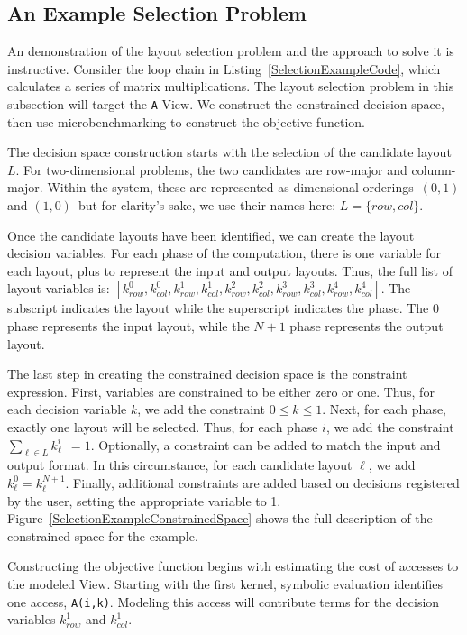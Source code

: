\subsection{An Example Selection Problem}

An demonstration of the layout selection problem and the approach to solve it is instructive.
Consider the loop chain in Listing~\ref{SelectionExampleCode}, which calculates a series of matrix multiplications.
The layout selection problem in this subsection will target the \verb.A. View.
We construct the constrained decision space, then use microbenchmarking to construct the objective function.

The decision space construction starts with the selection of the candidate layout $L$.
For two-dimensional problems, the two candidates are row-major and column-major.
Within the system, these are represented as dimensional orderings--$(0,1)$ and $(1,0)$--but for clarity's sake, we use their names here: $L=\{row,col\}$.

Once the candidate layouts have been identified, we can create the layout decision variables.
For each phase of the computation, there is one variable for each layout, plus to represent the input and output layouts.
Thus, the full list of layout variables is: $[k_{row}^{0}, k_{col}^{0}, k_{row}^{1}, k_{col}^{1},k_{row}^{2}, k_{col}^{2},k_{row}^{3}, k_{col}^{3},k_{row}^{4}, k_{col}^{4}]$.
The subscript indicates the layout while the superscript indicates the phase. 
The 0 phase represents the input layout, while the $N+1$ phase represents the output layout.

The last step in creating the constrained decision space is the constraint expression. 
First, variables are constrained to be either zero or one. 
Thus, for each decision variable $k$, we add the constraint $0 \leq k \leq 1$.
Next, for each phase, exactly one layout will be selected. 
Thus, for each phase $i$, we add the constraint $\sum_{\ell \in L} k_\ell^{i} \ \ = 1$.
Optionally, a constraint can be added to match the input and output format.
In this circumstance, for each candidate layout $\ell$, we add $k_\ell^{0} = k_\ell^{N+1}$.
Finally, additional constraints are added based on decisions registered by the user, setting the appropriate variable to 1.
Figure~\ref{SelectionExampleConstrainedSpace} shows the full description of the constrained space for the example.


Constructing the objective function begins with estimating the cost of accesses to the modeled View.
Starting with the first kernel, symbolic evaluation identifies one access, \verb.A(i,k)..
Modeling this access will contribute terms for the decision variables $k_{row}^1$ and $k_{col}^1$.


